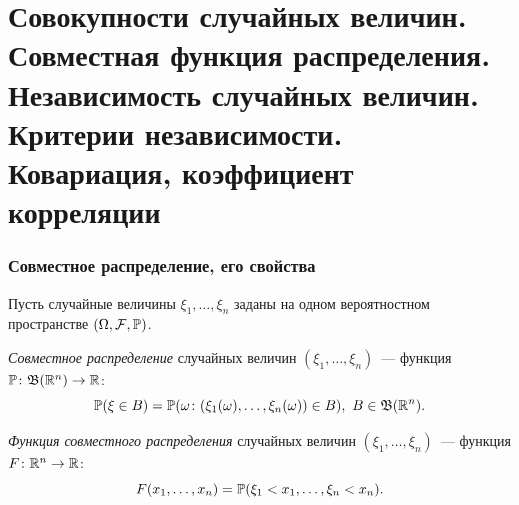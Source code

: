 \section{Совокупности случайных величин. Совместная функция распределения. Независимость случайных величин. Критерии независимости. Ковариация, коэффициент корреляции}

\subsubsection{Совместное распределение, его свойства}

Пусть случайные величины $\xi_1, \ldots, \xi_n$ заданы на одном вероятностном пространстве $(\Omega, \mathcal{F}, \operatorname{\mathbb{P}})$.
\begin{defn}
    \textit{Совместное распределение} случайных величин $(\xi_1, \ldots, \xi_n)$~--- функция $\operatorname{\mathbb{P}}\colon \mathfrak{B}(\mathbb{R}^{n}) \to \mathbb{R}$:
    \begin{equation*}
        \operatorname{\mathbb{P}}(\xi \in B) = \operatorname{\mathbb{P}}(\omega \colon (\xi_{1}(\omega), \ldots, \xi_{n}(\omega)) \in B),~ B \in \mathfrak{B}(\mathbb{R}^{n}).
    \end{equation*}
\end{defn}
\begin{defn}
    \textit{Функция совместного распределения} случайных величин $(\xi_1, \ldots, \xi_n)$~--- функция $F\colon \mathbb{R}^{n} \to \mathbb{R}$:
    \begin{equation*}
        F(x_{1}, \ldots, x_{n})=\operatorname{\mathbb{P}}(\xi_{1}<x_{1}, \ldots, \xi_{n}<x_{n}).
    \end{equation*}
\end{defn}

